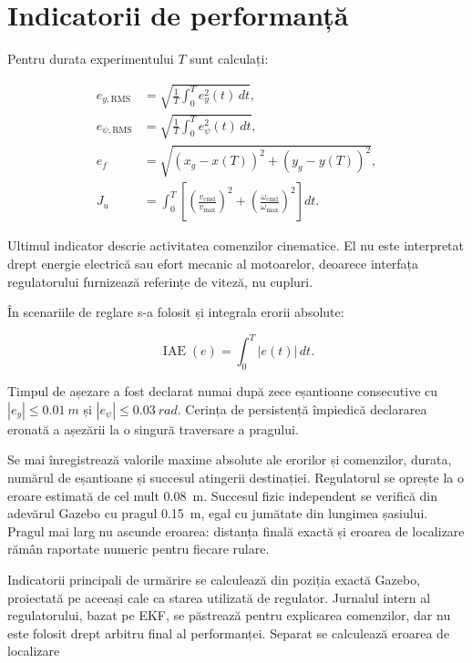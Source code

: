 \documentclass[12pt,a4paper,oneside]{report}
\begin{document}
\section{Indicatorii de performanță}

Pentru durata experimentului $T$ sunt calculați:

\begin{align}
  e_{y,\mathrm{RMS}} &=
  \sqrt{\frac{1}{T}\int_0^T e_y^2(t)\,dt}, \\
  e_{\psi,\mathrm{RMS}} &=
  \sqrt{\frac{1}{T}\int_0^T e_\psi^2(t)\,dt}, \\
  e_f &= \sqrt{(x_g-x(T))^2+(y_g-y(T))^2}, \\
  J_u &= \int_0^T\left[
    \left(\frac{v_{\mathrm{cmd}}}{v_{\max}}\right)^2+
    \left(\frac{\omega_{\mathrm{cmd}}}{\omega_{\max}}\right)^2
  \right]dt.
\end{align}

Ultimul indicator descrie activitatea comenzilor cinematice. El nu este
interpretat drept energie electrică sau efort mecanic al motoarelor, deoarece
interfața regulatorului furnizează referințe de viteză, nu cupluri.

În scenariile de reglare s-a folosit și integrala erorii absolute:

\begin{equation}
  \operatorname{IAE}(e)=\int_0^T |e(t)|\,dt.
\end{equation}

Timpul de așezare a fost declarat numai după zece eșantioane consecutive cu
$|e_y|\leq\SI{0.01}{m}$ și $|e_\psi|\leq\SI{0.03}{rad}$. Cerința de persistență
împiedică declararea eronată a așezării la o singură traversare a pragului.

Se mai înregistrează valorile maxime absolute ale erorilor și comenzilor,
durata, numărul de eșantioane și succesul atingerii destinației. Regulatorul se
oprește la o eroare estimată de cel mult \SI{0.08}{m}. Succesul fizic independent
se verifică din adevărul Gazebo cu pragul \SI{0.15}{m}, egal cu jumătate din
lungimea șasiului. Pragul mai larg nu ascunde eroarea: distanța finală exactă și
eroarea de localizare rămân raportate numeric pentru fiecare rulare.

Indicatorii principali de urmărire se calculează din poziția exactă Gazebo,
proiectată pe aceeași cale ca starea utilizată de regulator. Jurnalul intern al
regulatorului, bazat pe EKF, se păstrează pentru explicarea comenzilor, dar nu
este folosit drept arbitru final al performanței. Separat se calculează eroarea
de localizare
\end{document}
